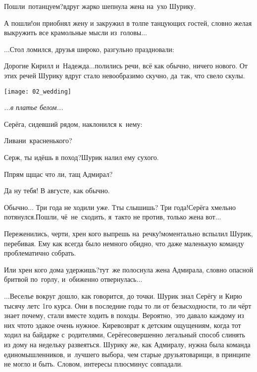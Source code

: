 {\begin{minipage}{0.48\textwidth}
	\indent \diagdash Пошли~потанцуем?\mdash вдруг жарко шепнула жена на~ухо Шурику.
	
	\indent \diagdash А пошли!\mdash он приобнял жену и закружил в толпе танцующих гостей, словно желая выкружить все крамольные мысли из~головы$\ldots$
	
	\indent $\ldots$Стол ломился, друзья широко, разгульно праздновали:
	
	\indent \diagdash Дорогие Кирилл и~Надежда$\ldots$\mdash полились речи, всё как обычно, ничего нового. От этих речей Шурику вдруг стало невообразимо скучно, да~так, что свело скулы.
\end{minipage}\hfill
\begin{minipage}{0.5\textwidth}
	\centering
	\texttt{[image: 02\_wedding]}
	
	{\small\textit{...в платье белом...}}
\end{minipage}

Серёга, сидевший рядом, наклонился к~нему:

\diagdash Ливани~красненького?

\diagdash Серж, ты идёшь в поход?\mdash Шурик налил ему сухого. 

\diagdash П\sdash прям щ\sdash щас что ли, тащ Адмирал?

\diagdash Да ну тебя! В августе, как обычно.

\diagdash Обычно$\ldots$ Три года не ходили уже. Т\sdash ты слышишь? Три года!\mdash Серёга хмельно потянулся.\mdash Пошли, чё~не~сходить, я~так\sdash то не против, только жена вот$\ldots$

\diagdash Переженились, черти, хрен кого выпрешь на~речку!\mdash моментально вспылил Шурик, перебивая. Ему как всегда было немного обидно, что даже маленькую команду проблематично собрать.

\diagdash Или хрен кого дома удержишь?\mdash тут~же полоснула жена Адмирала, словно опасной бритвой по~горлу, и~обиженно отвернулась$\ldots$ 

\vspace{0.5cm}
$\ldots$Веселье вокруг дошло, как говорится, до точки. Шурик знал Серёгу и Кирю тысячу лет\mdash с 1\sdash го курса. Они в последние годы то ли от безысходности, то ли чёрт знает почему, стали вместе ходить в походы. Вероятно,~это давало каждому из них что\sdash то эдакое очень нужное. Кире\mdash возврат к детским ощущениям, когда тот ходил на байдарке с~родителями, Серёге\mdash совершенно легальный способ слинять из дому на недельку развеяться. Шурику же, как Адмиралу, нужна была команда единомышленников, и~лучшего выбора, чем старые друзья\sdash товарищи, в принципе не могло и быть. Словом, интересы плюс\sdash минус совпадали. 

}
